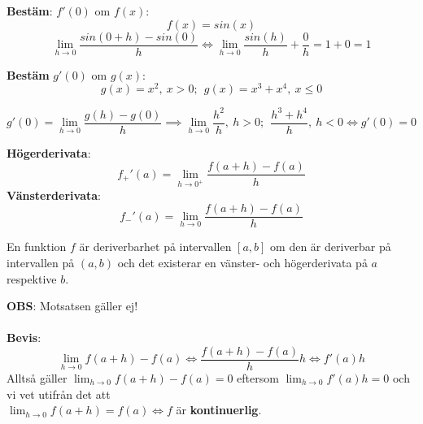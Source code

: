 \documentclass{report}
\begin{document}
\qs{}
{
\textbf{Bestäm}: $ f'(0) $ om $ f(x) $:
\begin{equation*}
f(x) = sin(x)
\end{equation*}
}
\sol
\begin{equation*}
	\lim_{h \to 0} \frac{sin(0+h)-sin(0)}{h} \iff \lim_{h \to 0} \frac{sin(h)}{h} + \frac{0}{h} = 1+0 = 1
\end{equation*}

\vspace{20pt}
\qs{}
{
\textbf{Bestäm} $ g'(0) $ om $ g(x) $:
\begin{equation*}
g(x) = x^2,\:x > 0;\:\: g(x) = x^3+x^4,\:x \le 0
\end{equation*}
}

\sol
\begin{equation*}
	g'(0) = \lim_{h \to 0} \frac{g(h)-g(0)}{h} \implies \lim_{h \to 0} \frac{h^2}{h} ,\:h > 0;\:\: \frac{h^3+h^4}{h} ,\: h < 0 \iff g'(0) = 0
\end{equation*}

\vspace{20pt}
{
\textbf{Högerderivata}:
\begin{equation*}
f_+ ' (a) = \lim_{h \to 0^+} \frac{f(a+h)-f(a)}{h}  
\end{equation*}
\textbf{Vänsterderivata}:
\begin{equation*}
f_-'(a) = \lim_{h \to 0} \frac{f(a+h)-f(a)}{h} 
\end{equation*}
}

{
	En funktion $ f $ är deriverbarhet på intervallen $ [a,b] $ om den är deriverbar på intervallen på $ (a,b) $ och det existerar en vänster- och högerderivata på $ a $ respektive $ b $.
}

{ 
\textbf{OBS}: Motsatsen gäller ej!\\\\

\textbf{Bevis}:
\begin{equation*}
\lim_{h \to 0} f(a+h)-f(a) \iff  \frac{f(a+h)-f(a)}{h} h \iff f'(a)h 
\end{equation*}
Alltså gäller $ \lim_{h \to 0} f(a+h)-f(a) = 0 $ eftersom $ \lim_{h \to 0} f'(a)h = 0 $  och vi vet utifrån det att\\$ \lim_{h \to 0} f(a+h) = f(a) \iff  f $ är \textbf{kontinuerlig}. 
}
\end{document}
